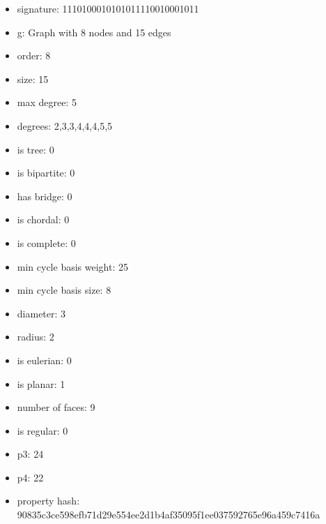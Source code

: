 \begin{itemize}
\item signature: 1110100010101011110010001011
\item g: Graph with 8 nodes and 15 edges
\item order: 8
\item size: 15
\item max degree: 5
\item degrees: 2,3,3,4,4,4,5,5
\item is tree: 0
\item is bipartite: 0
\item has bridge: 0
\item is chordal: 0
\item is complete: 0
\item min cycle basis weight: 25
\item min cycle basis size: 8
\item diameter: 3
\item radius: 2
\item is eulerian: 0
\item is planar: 1
\item number of faces: 9
\item is regular: 0
\item p3: 24
\item p4: 22
\item property hash: 90835c3ce598efb71d29e554ee2d1b4af35095f1ee037592765e96a459c7416a
\end{itemize}
\newpage
\begin{figure}
\end{figure}
